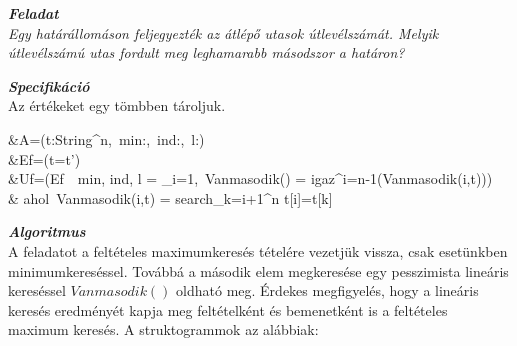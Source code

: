 \documentclass[12pt,a4paper]{article}			%
\newcommand{\fejezet}[1]{\noindent \textbf{\textit{\large #1 \vspace{5mm}}}}
\begin{document}
	
	\fejezet{Feladat}\\
	\textit{Egy határállomáson feljegyezték az átlépő utasok útlevélszámát. Melyik útlevélszámú
	utas fordult meg leghamarabb másodszor a határon?}
	\vspace{5mm}

	\fejezet{Specifikáció}\\
	Az értékeket egy tömbben tároljuk. 
		\begin{flalign*}
			&A=(t:String^n,~min:\mathbb{N},~ind:,~l:)\\
			&Ef=(t=t')\\
			&Uf=(Ef~\wedge~min, ind, l = \min _{i=1,~Vanmasodik() = igaz}^{i=n-1}(Vanmasodik(i,t)))\\
			& ahol~Vanmasodik(i,t) = search_{k=i+1}^{n} t[i]=t[k]
		\end{flalign*}
	
	\fejezet{Algoritmus}\\
	A feladatot a feltételes maximumkeresés tételére vezetjük vissza, csak esetünkben minimumkereséssel. Továbbá a második elem megkeresése egy pesszimista lineáris kereséssel $Vanmasodik()$ oldható meg. Érdekes megfigyelés, hogy a lineáris keresés eredményét kapja meg feltételként és bemenetként is a feltételes maximum keresés. A struktogrammok az alábbiak: \vspace{5mm}\\
		\noindent\hfill
		\begin{stukibox}[6cm]
		\end{stukibox}
		\hfill
		\begin{stukibox}[4cm]
		\end{stukibox}
		\hfill{}
\end{document}
